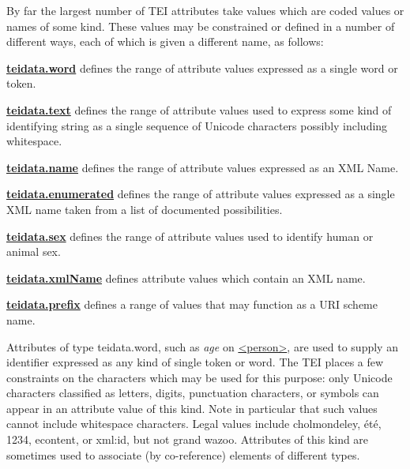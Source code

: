 \par
By far the largest number of TEI attributes take values which are coded values or names of some kind. These values may be constrained or defined in a number of different ways, each of which is given a different name, as follows: 
\begin{sansreflist}
  
\item {\bfseries \hyperref[TEI.teidata.word]{teidata.word}} defines the range of attribute values expressed as a single word or token.
\item {\bfseries \hyperref[TEI.teidata.text]{teidata.text}} defines the range of attribute values used to express some kind of identifying string as a single sequence of Unicode characters possibly including whitespace.
\item {\bfseries \hyperref[TEI.teidata.name]{teidata.name}} defines the range of attribute values expressed as an XML Name.
\item {\bfseries \hyperref[TEI.teidata.enumerated]{teidata.enumerated}} defines the range of attribute values expressed as a single XML name taken from a list of documented possibilities.
\item {\bfseries \hyperref[TEI.teidata.sex]{teidata.sex}} defines the range of attribute values used to identify human or animal sex.
\item {\bfseries \hyperref[TEI.teidata.xmlName]{teidata.xmlName}} defines attribute values which contain an XML name.
\item {\bfseries \hyperref[TEI.teidata.prefix]{teidata.prefix}} defines a range of values that may function as a URI scheme name.
\end{sansreflist}
\par
Attributes of type \textsf{teidata.word}, such as {\itshape age} on \hyperref[TEI.person]{<person>}, are used to supply an identifier expressed as any kind of single token or word. The TEI places a few constraints on the characters which may be used for this purpose: only Unicode characters classified as letters, digits, punctuation characters, or symbols can appear in an attribute value of this kind. Note in particular that such values cannot include whitespace characters. Legal values include cholmondeley, été, 1234, e\textunderscore content, or xml:id, but not grand wazoo. Attributes of this kind are sometimes used to associate (by co-reference) elements of different types.\par
